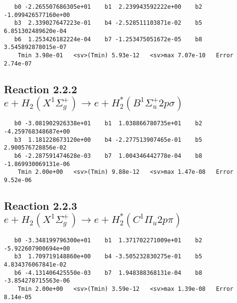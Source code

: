 \documentclass[12pt]{article}
\begin{document}
\begin{small}\begin{verbatim}
   b0 -2.265507686305e+01    b1  2.239943592222e+00    b2 -1.099426577160e+00
   b3  2.339027647223e-01    b4 -2.528511103871e-02    b5  6.851302489620e-04
   b6  1.253426182224e-04    b7 -1.253475051672e-05    b8  3.545892878015e-07
    Tmin 3.98e-01   <sv>(Tmin) 5.93e-12   <sv>max 7.07e-10   Error 2.74e-07
\end{verbatim}\end{small}

\newpage
\subsection{
Reaction 2.2.2 $e + H_2(X^1\Sigma_g^+) \rightarrow e + H_2^*(B^1\Sigma_u^+2p\sigma)$}














\begin{small}\begin{verbatim}
   b0 -3.081902926338e+01    b1  1.038866780735e+01    b2 -4.259768348687e+00
   b3  1.181228673120e+00    b4 -2.277513907465e-01    b5  2.900576728856e-02
   b6 -2.287591474628e-03    b7  1.004346442778e-04    b8 -1.869930069131e-06
    Tmin 2.00e+00   <sv>(Tmin) 9.88e-12   <sv>max 1.47e-08   Error 9.52e-06
\end{verbatim}\end{small}

\newpage
\subsection{
Reaction 2.2.3 $e + H_2(X^1\Sigma_g^+) \rightarrow e + H_2^*(C^1\Pi_u2p\pi) $}













\begin{small}\begin{verbatim}
   b0 -3.348199796300e+01    b1  1.371702271009e+01    b2 -5.922607900694e+00
   b3  1.709719148860e+00    b4 -3.505232830275e-01    b5  4.834376067841e-02
   b6 -4.131406425550e-03    b7  1.948388368131e-04    b8 -3.854278715563e-06
    Tmin 2.00e+00   <sv>(Tmin) 3.59e-12   <sv>max 1.39e-08   Error 8.14e-05
\end{verbatim}\end{small}
\end{document}
